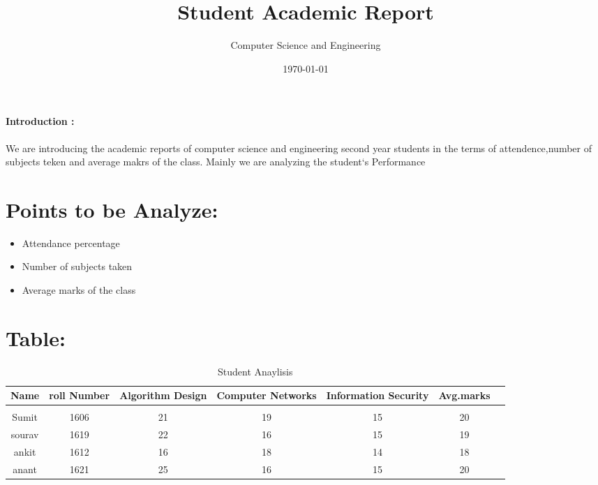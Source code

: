 \documentclass{article}
\title{\textbf{Student Academic Report}}
\author{Computer Science and Engineering}
\date{\today}
\begin{document}
\maketitle
\paragraph{Introduction :}
We are introducing the academic reports of computer science and engineering second year students in the terms of attendence,number of subjects teken and average makrs of the class. Mainly we are analyzing the student`s Performance 
\section{Points to be Analyze:}
\begin{itemize}
    \item Attendance percentage
    \item Number of subjects taken
    \item Average marks of the class
\end{itemize}
\section{Table:}
\begin{table}[h]
    \centering
    \begin{tabular}{|c|c|c|c|c|C|c|}
    \hline
        Name & roll Number & Algorithm Design & Computer Networks &Information Security& Avg.marks  \\
          \hline \\
        Sumit &1606 &21&19&15&20 \\
          sourav &1619 &22&16&15 &19  \\
        ankit &1612 &16&18&14 &18  \\
        anant &1621 &25&16&15 &20  \\
        \hline
    \end{tabular}
    \caption{Student Anaylisis}
    \label{tab:my_label}
\end{table}
\end{document}
